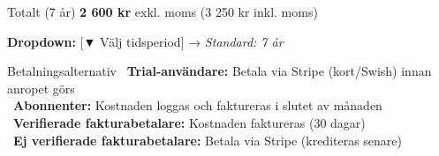 \documentclass[10pt]{beamer}
\begin{document}
\begin{frame}[label=popup-layering-kostnad]
  \vspace{0.5cm}
  
  \begin{block}{Totalt (7 år)}
    \Large\textbf{2 600 kr} exkl. moms (3 250 kr inkl. moms)
  \end{block}
  
  \vspace{0.3cm}
  
  \textbf{Dropdown:} [▼ Välj tidsperiod] → \textit{Standard: 7 år}
  
  \vspace{0.5cm}
  
  \begin{alertblock}{Betalningsalternativ}
    \footnotesize
    \textbullet\ \textbf{Trial-användare:} Betala via Stripe (kort/Swish) innan anropet görs\\
    \textbullet\ \textbf{Abonnenter:} Kostnaden loggas och faktureras i slutet av månaden\\
    \textbullet\ \textbf{Verifierade fakturabetalare:} Kostnaden faktureras (30 dagar)\\
    \textbullet\ \textbf{Ej verifierade fakturabetalare:} Betala via Stripe (krediteras senare)
  \end{alertblock}
  
  \vspace{0.5cm}
  
  \begin{flushright}
    \hyperlink{likviditet}{} \hspace{0.3cm} 
    \hyperlink{likviditet}{} \hspace{0.3cm} 
  \end{flushright}
\end{frame}


\end{document}
